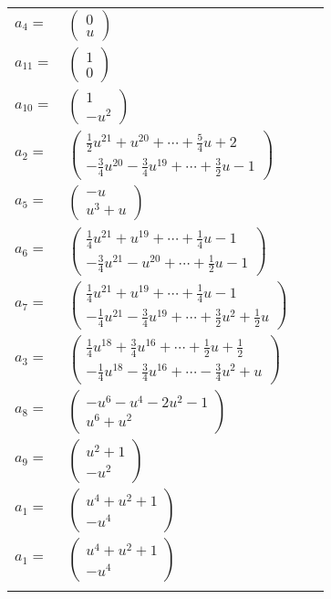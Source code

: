 \documentclass[1p]{elsarticle_modified}
\theoremstyle{definition}
\begin{document}
\begin{tabular}{m{7pt} m{180pt} m{7pt} m{180pt} }
\flushright $a_{4}=$&$\begin{pmatrix}0\\u\end{pmatrix}$ \\
\flushright $a_{11}=$&$\begin{pmatrix}1\\0\end{pmatrix}$ \\
\flushright $a_{10}=$&$\begin{pmatrix}1\\- u^2\end{pmatrix}$ \\
\flushright $a_{2}=$&$\begin{pmatrix}\frac{1}{2} u^{21}+u^{20}+\cdots+\frac{5}{4} u+2\\-\frac{3}{4} u^{20}-\frac{3}{4} u^{19}+\cdots+\frac{3}{2} u-1\end{pmatrix}$ \\
\flushright $a_{5}=$&$\begin{pmatrix}- u\\u^3+u\end{pmatrix}$ \\
\flushright $a_{6}=$&$\begin{pmatrix}\frac{1}{4} u^{21}+u^{19}+\cdots+\frac{1}{4} u-1\\-\frac{3}{4} u^{21}- u^{20}+\cdots+\frac{1}{2} u-1\end{pmatrix}$ \\
\flushright $a_{7}=$&$\begin{pmatrix}\frac{1}{4} u^{21}+u^{19}+\cdots+\frac{1}{4} u-1\\-\frac{1}{4} u^{21}-\frac{3}{4} u^{19}+\cdots+\frac{3}{2} u^2+\frac{1}{2} u\end{pmatrix}$ \\
\flushright $a_{3}=$&$\begin{pmatrix}\frac{1}{4} u^{18}+\frac{3}{4} u^{16}+\cdots+\frac{1}{2} u+\frac{1}{2}\\-\frac{1}{4} u^{18}-\frac{3}{4} u^{16}+\cdots-\frac{3}{4} u^2+u\end{pmatrix}$ \\
\flushright $a_{8}=$&$\begin{pmatrix}- u^6- u^4-2 u^2-1\\u^6+u^2\end{pmatrix}$ \\
\flushright $a_{9}=$&$\begin{pmatrix}u^2+1\\- u^2\end{pmatrix}$ \\
\flushright $a_{1}=$&$\begin{pmatrix}u^4+u^2+1\\- u^4\end{pmatrix}$\\ \flushright $a_{1}=$&$\begin{pmatrix}u^4+u^2+1\\- u^4\end{pmatrix}$\\&\end{tabular}
\end{document}
